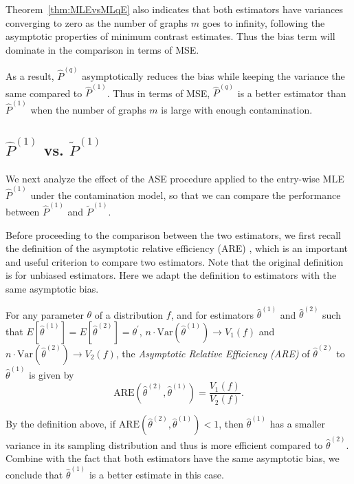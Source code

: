 Theorem~\ref{thm:MLEvsMLqE} also indicates that both estimators have variances converging to zero as the number of graphs $m$ goes to infinity, following the asymptotic properties of minimum contrast estimates. Thus the bias term will dominate in the comparison in terms of MSE.

As a result, $\hat{P}^{(q)}$ asymptotically reduces the bias while keeping the variance the same compared to $\hat{P}^{(1)}$. Thus in terms of MSE, $\hat{P}^{(q)}$ is a better estimator than $\hat{P}^{(1)}$ when the number of graphs $m$ is large with enough contamination.

\subsection[MLE vs. ASE of MLE]{$\hat{P}^{(1)}$ vs. $\widetilde{P}^{(1)}$}
We next analyze the effect of the ASE procedure applied to the entry-wise MLE $\hat{P}^{(1)}$ under the contamination model, so that we can compare the performance between $\hat{P}^{(1)}$ and $\widetilde{P}^{(1)}$.

Before proceeding to the comparison between the two estimators, we first recall the definition of the asymptotic relative efficiency (ARE) \citep{serfling2011asymptotic}, which is an important and useful criterion to compare two estimators. Note that the original definition is for unbiased estimators. Here we adapt the definition to estimators with the same asymptotic bias.
\begin{definition} 
For any parameter $\theta$ of a distribution $f$, and for estimators $\hat{\theta}^{(1)}$ and $\hat{\theta}^{(2)}$ such that $E[\hat{\theta}^{(1)}] = E[\hat{\theta}^{(2)}] = \theta^{\prime}$, $n \cdot \mathrm{Var}(\hat{\theta}^{(1)}) \to V_1(f)$ and $n \cdot \mathrm{Var}(\hat{\theta}^{(2)}) \to V_2(f)$, the {\em{Asymptotic Relative Efficiency (ARE)}} of $\hat{\theta}^{(2)}$ to $\hat{\theta}^{(1)}$ is given by
\[
	\mathrm{ARE}(\hat{\theta}^{(2)}, \hat{\theta}^{(1)}) = \frac{V_1(f)}{V_2(f)}.
\]
\end{definition}

By the definition above, if $\mathrm{ARE}(\hat{\theta}^{(2)}, \hat{\theta}^{(1)}) < 1$, then $\hat{\theta}^{(1)}$ has a smaller variance in its sampling distribution and thus is more efficient compared to $\hat{\theta}^{(2)}$. Combine with the fact that both estimators have the same asymptotic bias, we conclude that $\hat{\theta}^{(1)}$ is a better estimate in this case.

